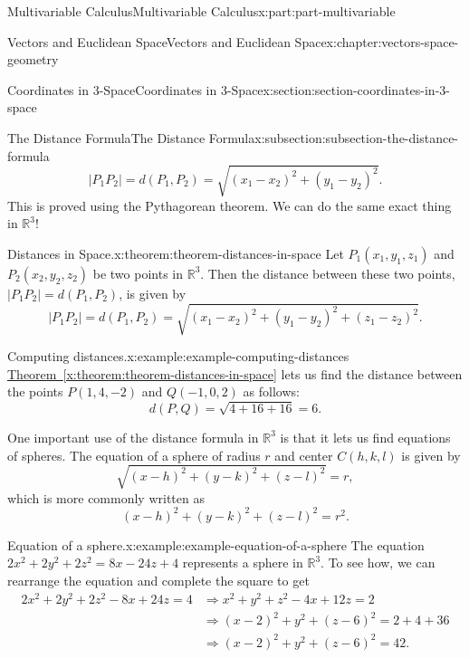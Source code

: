 \documentclass[twoside,10pt,]{book}
\newcommand{\xreffont}{\relax}
\numberwithin{equation}{part}
\newcommand{\RR}{\mathbb{R}}
\begin{document}
\begin{partptx}{Multivariable Calculus}{}{Multivariable Calculus}{}{}{x:part:part-multivariable}
\begin{chapterptx}{Vectors and Euclidean Space}{}{Vectors and Euclidean Space}{}{}{x:chapter:vectors-space-geometry}
\begin{sectionptx}{Coordinates in 3-Space}{}{Coordinates in 3-Space}{}{}{x:section:section-coordinates-in-3-space}
\begin{subsectionptx}{The Distance Formula}{}{The Distance Formula}{}{}{x:subsection:subsection-the-distance-formula}
\begin{equation*}
|P_{1}P_{2}| = d(P_{1},P_{2}) = \sqrt{(x_{1}-x_{2})^{2}+(y_{1}-y_{2})^{2}}.
\end{equation*}
This is proved using the Pythagorean theorem. We can do the same exact thing in \(\RR^{3}\)!%
\begin{theorem}{Distances in Space.}{}{x:theorem:theorem-distances-in-space}%
%
Let \(P_{1}(x_{1},y_{1},z_{1})\) and \(P_{2}(x_{2},y_{2},z_{2})\) be two points in \(\RR^{3}\). Then the distance between these two points, \(|P_{1}P_{2}| = d(P_{1},P_{2})\), is given by%
\begin{equation*}
|P_{1}P_{2}| = d(P_{1},P_{2}) = \sqrt{(x_{1}-x_{2})^{2}+(y_{1}-y_{2})^{2} + (z_{1}-z_{2})^{2}}.
\end{equation*}
%
\end{theorem}
\begin{example}{Computing distances.}{x:example:example-computing-distances}%
\hyperref[x:theorem:theorem-distances-in-space]{Theorem~{\xreffont\ref{x:theorem:theorem-distances-in-space}}} lets us find the distance between the points \(P(1,4,-2)\) and \(Q(-1,0,2)\) as follows:%
%
\begin{equation*}
d(P,Q) = \sqrt{4+16+16} = 6.
\end{equation*}
\end{example}
One important use of the distance formula in \(\RR^{3}\) is that it lets us find equations of spheres. The equation of a sphere of radius \(r\) and center \(C(h,k,l)\) is given by%
\begin{equation*}
\sqrt{(x-h)^{2}+(y-k)^{2}+(z-l)^{2}} = r,
\end{equation*}
which is more commonly written as%
\begin{equation*}
(x-h)^{2}+(y-k)^{2}+(z-l)^{2} = r^{2}.
\end{equation*}
%
\begin{example}{Equation of a sphere.}{x:example:example-equation-of-a-sphere}%
The equation \(2x^{2}+2y^{2}+2z^{2} = 8x - 24z + 4\) represents a sphere in \(\RR^{3}\). To see how, we can rearrange the equation and complete the square to get%
%
\begin{align*}
2x^{2}+2y^{2}+2z^{2} - 8x + 24z = 4 & \Rightarrow x^{2}+y^{2}+z^{2} - 4x + 12z = 2 \\
& \Rightarrow (x-2)^{2} + y^{2} + (z-6)^{2} = 2 + 4 + 36\\
& \Rightarrow (x-2)^{2} + y^{2} + (z-6)^{2} = 42.
\end{align*}

\end{example}
\end{subsectionptx}
\end{sectionptx}
\end{chapterptx}
\end{partptx}
\end{document}
